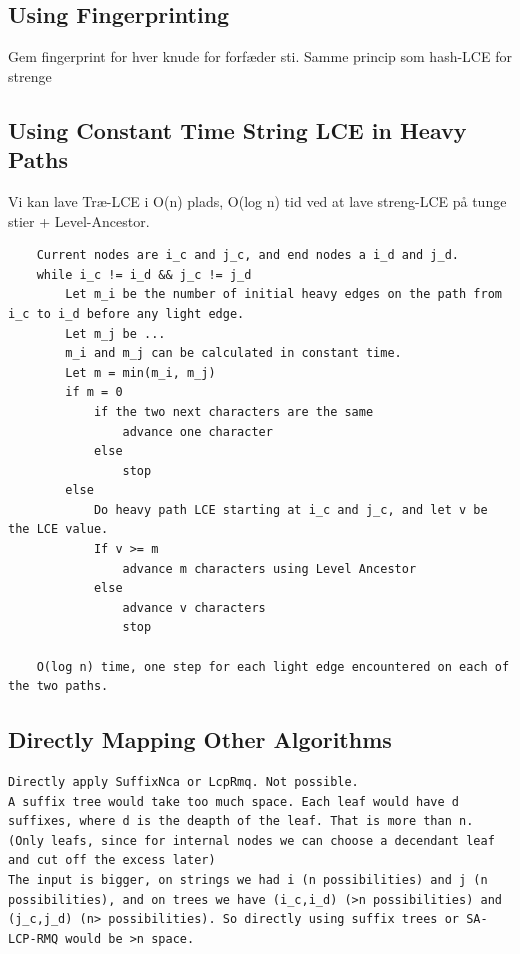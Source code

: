 \documentclass[a4]{article}
\begin{document}
\subsection{Using Fingerprinting}

Gem fingerprint for hver knude for forfæder sti. Samme princip som hash-LCE for strenge

\subsection{Using Constant Time String LCE in Heavy Paths}

Vi kan lave Træ-LCE i O(n) plads, O(log n) tid ved at lave streng-LCE på tunge stier + Level-Ancestor.

\begin{verbatim}
    Current nodes are i_c and j_c, and end nodes a i_d and j_d.
    while i_c != i_d && j_c != j_d
        Let m_i be the number of initial heavy edges on the path from i_c to i_d before any light edge.
        Let m_j be ...
        m_i and m_j can be calculated in constant time.
        Let m = min(m_i, m_j)
        if m = 0
            if the two next characters are the same
                advance one character
            else
                stop
        else
            Do heavy path LCE starting at i_c and j_c, and let v be the LCE value.
            If v >= m
                advance m characters using Level Ancestor
            else
                advance v characters
                stop

    O(log n) time, one step for each light edge encountered on each of the two paths.
\end{verbatim}

\subsection{Directly Mapping Other Algorithms}

\begin{verbatim}
Directly apply SuffixNca or LcpRmq. Not possible.
A suffix tree would take too much space. Each leaf would have d suffixes, where d is the deapth of the leaf. That is more than n. (Only leafs, since for internal nodes we can choose a decendant leaf and cut off the excess later)
The input is bigger, on strings we had i (n possibilities) and j (n possibilities), and on trees we have (i_c,i_d) (>n possibilities) and (j_c,j_d) (n> possibilities). So directly using suffix trees or SA-LCP-RMQ would be >n space.
\end{verbatim}
\end{document}
